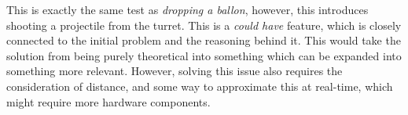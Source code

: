 This is exactly the same test as \textit{dropping a ballon}, however, this introduces shooting a projectile from the turret.
This is a \textit{could have} feature, which is closely connected to the initial problem and the reasoning behind it.
This would take the solution from being purely theoretical into something which can be expanded into something more relevant.
However, solving this issue also requires the consideration of distance, and some way to approximate this at real-time, which might require more hardware components.